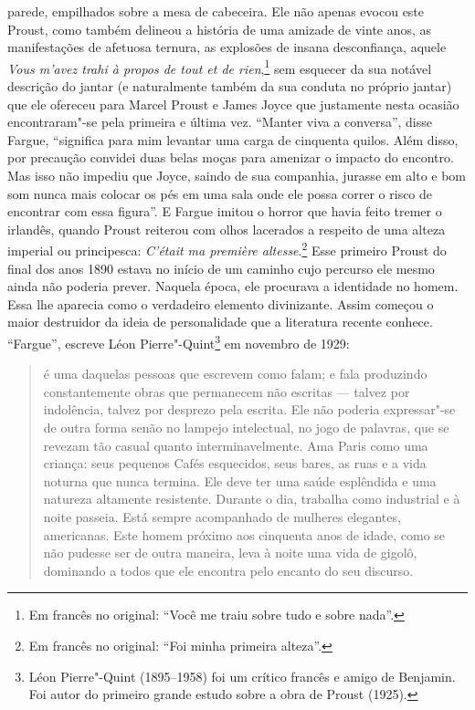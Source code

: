 parede, empilhados sobre a mesa de cabeceira. Ele não apenas evocou este
Proust, como também delineou a história de uma amizade de vinte anos, as
manifestações de afetuosa ternura, as explosões de insana desconfiança,
aquele \emph{Vous m'avez trahi à propos de tout et de rien},\footnote{Em francês no original: ``Você me traiu sobre tudo e sobre nada''. \versal{[N.~T.]}}
sem esquecer da sua notável descrição do jantar (e naturalmente também
da sua conduta no próprio jantar) que ele ofereceu para Marcel Proust e
James Joyce que justamente nesta ocasião encontraram"-se pela primeira e
última vez. ``Manter viva a conversa'', disse Fargue, ``significa para
mim levantar uma carga de cinquenta quilos. Além disso, por precaução
convidei duas belas moças para amenizar o impacto do encontro. Mas isso
não impediu que Joyce, saindo de sua companhia, jurasse em alto e bom
som nunca mais colocar os pés em uma sala onde ele possa correr o risco
de encontrar com essa figura''. E Fargue imitou o horror que havia feito
tremer o irlandês, quando Proust reiterou com olhos lacerados a respeito
de uma alteza imperial ou principesca: \emph{C'était ma première
altesse}.\footnote{Em francês no original: ``Foi minha primeira alteza''. \versal{[N.~T.]}} Esse primeiro Proust do final dos anos 1890 estava no
início de um caminho cujo percurso ele mesmo ainda não poderia prever.
Naquela época, ele procurava a identidade no homem. Essa lhe aparecia
como o verdadeiro elemento divinizante. Assim começou o maior destruidor
da ideia de personalidade que a literatura recente conhece. ``Fargue'',
escreve Léon Pierre"-Quint\footnote{Léon Pierre"-Quint (1895--1958) foi
  um crítico francês e amigo de Benjamin. Foi autor do primeiro grande
  estudo sobre a obra de Proust (1925). \versal{[N.~O.]}} em novembro de 1929:

\begin{quote}
é uma daquelas pessoas que escrevem como falam; e fala produzindo
constantemente obras que permanecem não escritas --- talvez por
indolência, talvez por desprezo pela escrita. Ele não poderia
expressar"-se de outra forma senão no lampejo intelectual, no jogo de
palavras, que se revezam tão casual quanto interminavelmente. Ama Paris
como uma criança: seus pequenos Cafés esquecidos, seus bares, as ruas e
a vida noturna que nunca termina. Ele deve ter uma saúde esplêndida e
uma natureza altamente resistente. Durante o dia, trabalha como
industrial e à noite passeia. Está sempre acompanhado de mulheres
elegantes, americanas. Este homem próximo aos cinquenta anos de idade,
como se não pudesse ser de outra maneira, leva à noite uma vida de
gigolô, dominando a todos que ele encontra pelo encanto do seu discurso.
\end{quote}

